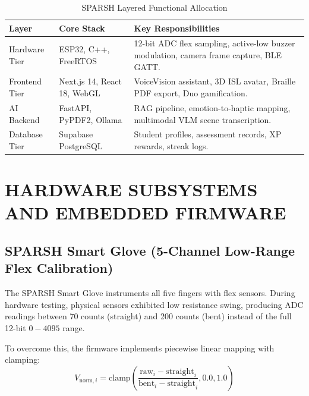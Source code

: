 \documentclass[12pt,a4paper]{report}
\begin{document}
\begin{table}[htbp]
    \centering
    \caption{SPARSH Layered Functional Allocation}
    \vspace{0.2cm}
    \renewcommand{\arraystretch}{1.2}
    \begin{tabularx}{\textwidth}{|l|l|X|}
        \hline
        \textbf{Layer} & \textbf{Core Stack} & \textbf{Key Responsibilities} \\ \hline
        Hardware Tier & ESP32, C++, FreeRTOS & 12-bit ADC flex sampling, active-low buzzer modulation, camera frame capture, BLE GATT. \\ \hline
        Frontend Tier & Next.js 14, React 18, WebGL & VoiceVision assistant, 3D ISL avatar, Braille PDF export, Duo gamification. \\ \hline
        AI Backend & FastAPI, PyPDF2, Ollama & RAG pipeline, emotion-to-haptic mapping, multimodal VLM scene transcription. \\ \hline
        Database Tier & Supabase PostgreSQL & Student profiles, assessment records, XP rewards, streak logs. \\ \hline
    \end{tabularx}
\end{table}

\chapter{HARDWARE SUBSYSTEMS AND EMBEDDED FIRMWARE}

\section{SPARSH Smart Glove (5-Channel Low-Range Flex Calibration)}
The SPARSH Smart Glove instruments all five fingers with flex sensors. During hardware testing, physical sensors exhibited low resistance swing, producing ADC readings between 70 counts (straight) and 200 counts (bent) instead of the full 12-bit $0-4095$ range. 

To overcome this, the firmware implements piecewise linear mapping with clamping:
\begin{equation}
    V_{\text{norm}, i} = \text{clamp}\left( \frac{\text{raw}_i - \text{straight}_i}{\text{bent}_i - \text{straight}_i}, 0.0, 1.0 \right)
\end{equation}
\end{document}
